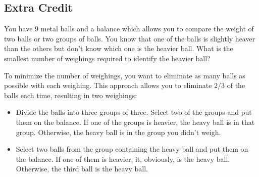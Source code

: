 \documentclass[fleqn,addpoints]{exam}
\begin{document}
\begin{questions}

    \section{Extra Credit}

    \question

    You have 9 metal balls and a balance which allows you to compare the weight of two balls or two
    groups of balls.  You know that one of the balls is slightly heaver than the others but don't
    know which one is the heavier ball.  What is the smallest number of weighings required to
    identify the heavier ball?

    \begin{solution}
      To minimize the number of weighings, you want to eliminate as many balls as possible with each
      weighing.  This approach allows you to eliminate \(2/3\) of the balls each time, resulting in
      two weighings:

      \begin{itemize}
        \item 
          Divide the balls into three groups of three.  Select two of the groups and put them on the
          balance.  If one of the groups is heavier, the heavy ball is in that group.  Otherwise,
          the heavy ball is in the group you didn't weigh.

        \item 
          Select two balls from the group containing the heavy ball and put them on the balance.  If
          one of them is heavier, it, obviously, is the heavy ball.  Otherwise, the third ball is
          the heavy ball. 


\end{itemize}
\end{solution}
\end{questions}
\end{document}
